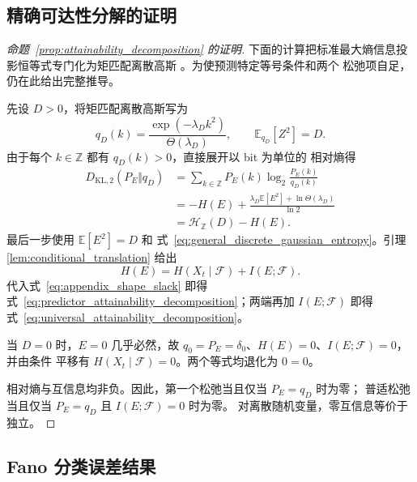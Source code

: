\subsection{精确可达性分解的证明}

\begin{proof}[命题~\ref{prop:attainability_decomposition} 的证明]
下面的计算把标准最大熵信息投影恒等式专门化为矩匹配离散高斯
\citep{csiszar_iprojection,cover_thomas}。为使预测特定等号条件和两个
松弛项自足，仍在此给出完整推导。

先设 \(D>0\)，将矩匹配离散高斯写为
\[
q_D(k)
=
\frac{\exp(-\lambda_D k^2)}{\Theta(\lambda_D)},
\qquad
\mathbb{E}_{q_D}[Z^2]=D.
\]
由于每个 \(k\in\mathbb Z\) 都有 \(q_D(k)>0\)，直接展开以 bit 为单位的
相对熵得
\begin{align}
D_{\mathrm{KL},2}(P_E\Vert q_D)
&=
\sum_{k\in\mathbb{Z}}P_E(k)
\log_2\frac{P_E(k)}{q_D(k)}
\nonumber\\
&=
-H(E)
+
\frac{\lambda_D\mathbb{E}[E^2]
      +\ln\Theta(\lambda_D)}{\ln2}
\nonumber\\
&=
\mathcal{H}_{\mathbb{Z}}(D)-H(E).
\label{eq:appendix_shape_slack}
\end{align}
最后一步使用 \(\mathbb E[E^2]=D\) 和
式~\eqref{eq:general_discrete_gaussian_entropy}。引理
\ref{lem:conditional_translation} 给出
\[
H(E)=H(X_t\mid\mathcal{F})+I(E;\mathcal{F}).
\]
代入式~\eqref{eq:appendix_shape_slack} 即得
式~\eqref{eq:predictor_attainability_decomposition}；两端再加
\(I(E;\mathcal F)\) 即得
式~\eqref{eq:universal_attainability_decomposition}。

当 \(D=0\) 时，\(E=0\) 几乎必然，故
\(q_0=P_E=\delta_0\)、\(H(E)=0\)、\(I(E;\mathcal F)=0\)，并由条件
平移有 \(H(X_t\mid\mathcal F)=0\)。两个等式均退化为 \(0=0\)。

相对熵与互信息均非负。因此，第一个松弛当且仅当 \(P_E=q_D\) 时为零；
普适松弛当且仅当 \(P_E=q_D\) 且 \(I(E;\mathcal F)=0\) 时为零。
对离散随机变量，零互信息等价于独立。
\end{proof}

\subsection{Fano 分类误差结果}

